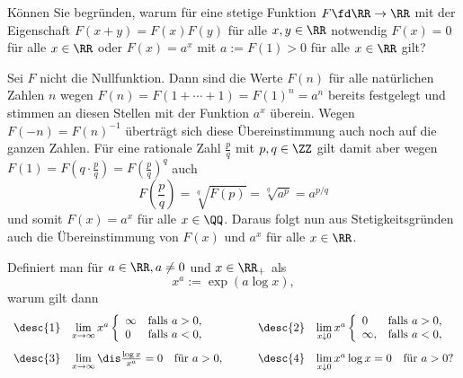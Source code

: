 \begin{frage}
  Können Sie begründen, warum für eine stetige Funktion 
  $F\fd \RR\to\RR$ mit der Eigenschaft $F(x+y)=F(x)F(y)$ für 
  alle $x,y\in\RR$ notwendig $F(x)=0$ für alle $x\in\RR$ oder 
  $F(x)=a^x$ mit $a:=F(1)>0$ für alle $x\in\RR$ gilt?
\end{frage}

\begin{antwort}
  Sei $F$ nicht die Nullfunktion. 
  Dann sind die Werte $F(n)$ für alle natürlichen Zahlen $n$ wegen 
  $F(n)=F(1+\cdots+1)=F(1)^n = a^n$ 
  bereits festgelegt und stimmen an diesen Stellen mit 
  der Funktion $a^x$ überein. 
  Wegen $F(-n)=F(n)^{-1}$ überträgt sich diese Übereinstimmung 
  auch noch auf die ganzen Zahlen. Für eine 
  rationale Zahl $\frac{p}{q}$ mit $p,q\in\ZZ$ 
  gilt damit aber wegen 
  $F( 1 )= F\left( q \cdot \frac{p}{q} \right ) = 
  F\left( \frac{p}{q} \right)^q$ auch
  \[ 
  F\left(  \frac{p}{q} \right) = \sqrt[q]{ F(p) } =  \sqrt[q]{ a^p }= a^{p/q}
  \]
  und somit $F(x)=a^x$ für alle $x\in\QQ$. 
  Daraus folgt nun aus Stetigkeitsgründen 
  auch die Übereinstimmung von $F(x)$ und $a^x$ für alle $x\in\RR$.  
  \AntEnd 
\end{antwort}

\begin{frage}
  Definiert man für $a\in\RR, a\not=0$ und $x\in\RR_+$ als 
  \[
  \boxed{ x^a := \exp( a\log x),}
  \]
  warum gilt dann
  \[
  \begin{array}{llp{4mm}ll}
    \desc{1} & 
    \lim\limits_{x\to\infty} x^a \left\{ 
      \begin{array}{ll} 
        \infty & \text{falls $a>0$,} \\
        0 & \text{falls $a<0$,} 
      \end{array} \right.
    & &
    \desc{2} & 
    \lim\limits_{x\downarrow 0} x^a \left\{ 
      \begin{array}{ll} 
        0 & \text{falls $a>0$,} \\
        \infty, & \text{falls $a<0$,} 
      \end{array} \right.
    \\[5mm]
    \desc{3} & 
    \lim\limits_{x\to\infty} \dis\frac{\log x}{x^a} = 0\quad \text{für $a>0$,} 
    & &
    \desc{4} &
    \lim\limits_{x\downarrow 0} x^a \log x =0 \quad\text{für $a>0$?}
  \end{array}
  \] 
\end{frage}

